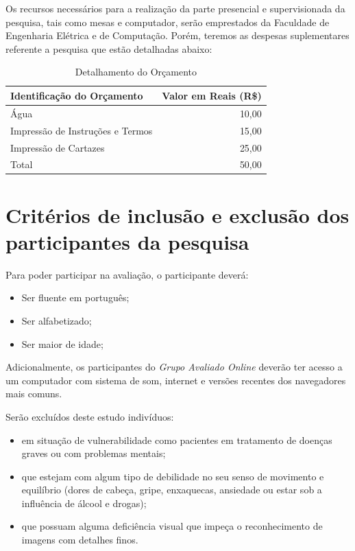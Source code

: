 \documentclass[a4paper,11pt,titlepage,singlespacing]{article}
\begin{document}
Os recursos necessários para a realização da parte presencial e supervisionada da pesquisa, tais como mesas e computador, serão emprestados da Faculdade de Engenharia Elétrica e de Computação. Porém, teremos as despesas suplementares referente a pesquisa que estão detalhadas abaixo:

\begin{table}[H]
\caption{Detalhamento do Orçamento}
\centering
\vspace{0.5cm}
\begin{tabular}{l|r}
Identificação do Orçamento & Valor em Reais (R\$) \\
\hline 
Água        & 10,00 \\
Impressão de Instruções e Termos  & 15,00 \\
Impressão de Cartazes  & 25,00 \\
\hline 
Total & 50,00
\end{tabular}
\end{table}

\section{Critérios de inclusão e exclusão dos participantes da pesquisa}

\noindent Para poder participar na avaliação, o participante deverá:

\begin{itemize}
    \item Ser fluente em português;
    \item Ser alfabetizado;
    \item Ser maior de idade;
\end{itemize}

\noindent Adicionalmente, os participantes do \textit{Grupo Avaliado Online} deverão ter acesso a um computador com sistema de som, internet e versões recentes dos navegadores mais comuns.

Serão excluídos deste estudo indivíduos:

\begin{itemize}
\item em situação de vulnerabilidade como pacientes em tratamento de doenças graves ou com problemas mentais;
\item que estejam com algum tipo de debilidade no seu senso de movimento e equilíbrio (dores de cabeça, gripe, enxaquecas, ansiedade ou estar sob a influência de álcool e drogas);
\item que possuam alguma deficiência visual que impeça o reconhecimento de imagens com detalhes finos.
\end{itemize}
\end{document}
